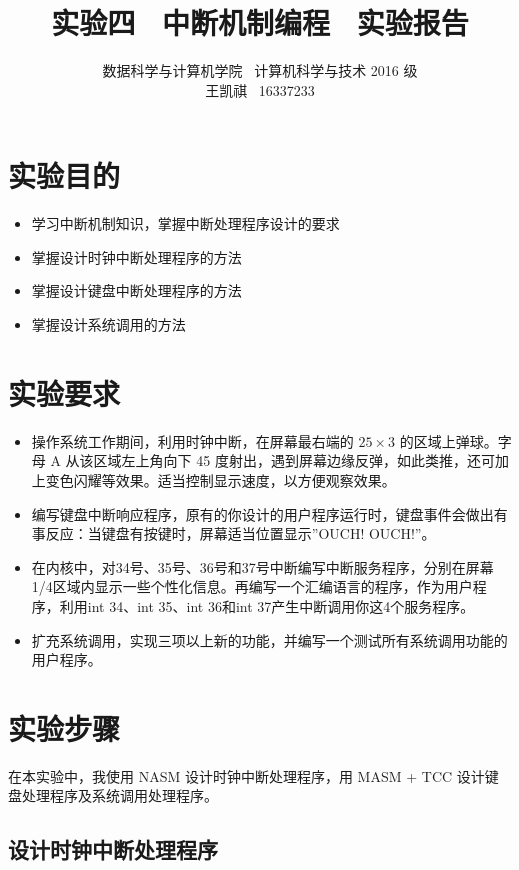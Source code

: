 \documentclass{article}
\begin{document}
\title{实验四 \ 中断机制编程 \ 实验报告}
\author {数据科学与计算机学院 \ 计算机科学与技术 2016 级 \\ 王凯祺 \ 16337233}
\maketitle

\section{实验目的}

\begin{itemize}
\item 学习中断机制知识，掌握中断处理程序设计的要求
\item 掌握设计时钟中断处理程序的方法
\item 掌握设计键盘中断处理程序的方法
\item 掌握设计系统调用的方法
\end{itemize}

\section{实验要求}

\begin{itemize}
\item 操作系统工作期间，利用时钟中断，在屏幕最右端的 $25 \times 3$ 的区域上弹球。字母 A 从该区域左上角向下 45 度射出，遇到屏幕边缘反弹，如此类推，还可加上变色闪耀等效果。适当控制显示速度，以方便观察效果。
\item 编写键盘中断响应程序，原有的你设计的用户程序运行时，键盘事件会做出有事反应：当键盘有按键时，屏幕适当位置显示”OUCH! OUCH!”。
\item 在内核中，对34号、35号、36号和37号中断编写中断服务程序，分别在屏幕1/4区域内显示一些个性化信息。再编写一个汇编语言的程序，作为用户程序，利用int 34、int 35、int 36和int 37产生中断调用你这4个服务程序。
\item 扩充系统调用，实现三项以上新的功能，并编写一个测试所有系统调用功能的用户程序。
\end{itemize}


\section{实验步骤}

在本实验中，我使用 NASM 设计时钟中断处理程序，用 MASM + TCC 设计键盘处理程序及系统调用处理程序。

\subsection{设计时钟中断处理程序}
\end{document}
